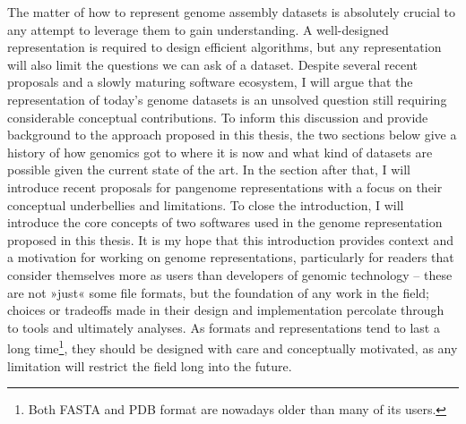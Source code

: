 The matter of how to represent genome assembly datasets is absolutely crucial to any attempt to leverage them to gain understanding.
A well-designed representation is required to design efficient algorithms, but any representation will also limit the questions we can ask of a dataset. %
Despite several recent proposals and a slowly maturing software ecosystem\cite{gfatools,garrison18}, I will argue that the representation of today's genome datasets is an unsolved question still requiring considerable conceptual contributions.
To inform this discussion and provide background to the approach proposed in this thesis, the two sections below give a history of how genomics got to where it is now and what kind of datasets are possible given the current state of the art.
In the section after that, I will introduce recent proposals for pangenome representations with a focus on their conceptual underbellies and limitations.
To close the introduction, I will introduce the core concepts of two softwares used in the genome representation proposed in this thesis.
It is my hope that this introduction provides context and a motivation for working on genome representations, particularly for readers that consider themselves more as users than developers of genomic technology -- these are not »just« some file formats, but the foundation of any work in the field; choices or tradeoffs made in their design and implementation percolate through to tools and ultimately analyses. %
As formats and representations tend to last a long time\footnote{Both FASTA and PDB format are nowadays older than many of its users.}, they should be designed with care and conceptually motivated, as any limitation will restrict the field  long into the future. %


